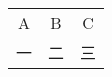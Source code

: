 \documentclass[nofonts]{ctexart}
\begin{document}
\begin{tabular}{|ccc|}
	\hline
	\rowcolor{lightgray}
	A	& B	& C	\\
	一	& 二& 三\\
	\hline
\end{tabular}
\end{document}
